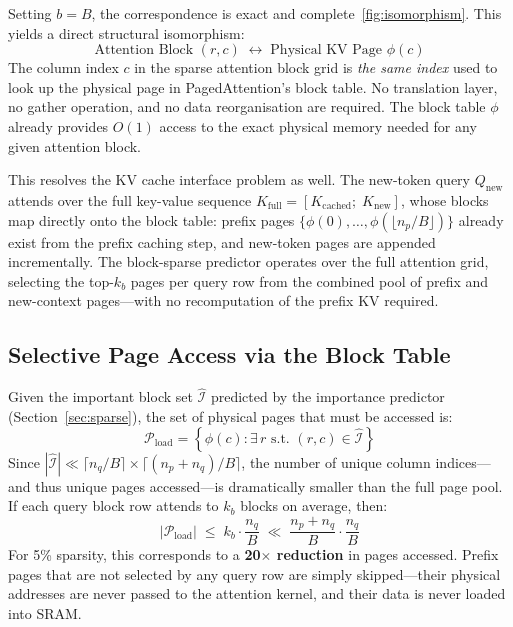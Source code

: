 \documentclass{article}
\begin{document}
Setting $b = B$, the correspondence is exact and complete~\ref{fig:isomorphism}. This yields a direct structural isomorphism:
%
\begin{equation}
  \text{Attention Block } (r, c)
  \;\longleftrightarrow\;
  \text{Physical KV Page } \phi(c)
  \label{eq:isomorphism}
\end{equation}
%
The column index $c$ in the sparse attention block grid is \textit{the same
index} used to look up the physical page in PagedAttention's block table.
No translation layer, no gather operation, and no data reorganisation are
required. The block table $\phi$ already provides $O(1)$ access to the
exact physical memory needed for any given attention block.

This resolves the KV cache interface problem as well. The new-token
query $Q_{\text{new}}$ attends over the full key-value sequence
$K_{\text{full}} = [K_{\text{cached}};\; K_{\text{new}}]$, whose blocks
map directly onto the block table: prefix pages
$\{\phi(0), \ldots, \phi(\lfloor n_p/B \rfloor)\}$ already exist from
the prefix caching step, and new-token pages are appended incrementally.
The block-sparse predictor operates over the full attention grid, selecting
the top-$k_b$ pages per query row from the combined pool of prefix and
new-context pages---with no recomputation of the prefix KV required.

\subsection{Selective Page Access via the Block Table}

Given the important block set $\hat{\mathcal{I}}$ predicted by the
importance predictor (Section~\ref{sec:sparse}), the set of physical pages
that must be accessed is:
%
\begin{equation}
  \mathcal{P}_{\text{load}}
  = \left\{\phi(c) : \exists\, r \text{ s.t. } (r, c) \in \hat{\mathcal{I}}\right\}
  \label{eq:pages-load}
\end{equation}
%
Since $|\hat{\mathcal{I}}| \ll \lceil n_q/B \rceil \times \lceil(n_p+n_q)/B\rceil$,
the number of unique column indices---and thus unique pages accessed---is
dramatically smaller than the full page pool. If each query block row
attends to $k_b$ blocks on average, then:
%
\begin{equation}
  |\mathcal{P}_{\text{load}}| \;\leq\; k_b \cdot \frac{n_q}{B}
  \;\ll\; \frac{n_p + n_q}{B} \cdot \frac{n_q}{B}
  \label{eq:page-reduction}
\end{equation}
%
For 5\% sparsity, this corresponds to a \textbf{20$\times$ reduction} in
pages accessed. Prefix pages that are not selected by any query row are
simply skipped---their physical addresses are never passed to the attention
kernel, and their data is never loaded into SRAM.
\end{document}
